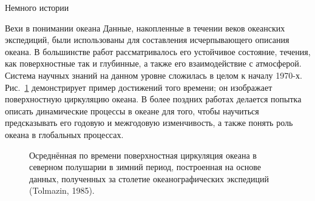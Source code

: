 \begin{chapter}{Немного истории}
\begin{section}{Вехи в понимании океана}
Данные, накопленные в течении веков океанских экспедиций, были
использованы для составления исчерпывающего описания океана.
В большинстве работ рассматривалось его устойчивое состояние, 
течения, как поверхностные так и глубинные, а также его взаимодействие с
атмосферой. Система научных знаний на данном уровне сложилась в целом   
к началу 1970-х. Рис.~\ref{fig:Fig2-8} демонстрирует пример достижений того 
времени; он изображает поверхностную циркуляцию океана. 
В более поздних работах делается попытка описать динамические
процессы в океане для того, чтобы научиться предсказывать его годовую и
межгодовую изменчивость, а также понять роль океана в глобальных
процессах.
%

\begin{figure}[t!]
\caption{Осреднённая по времени поверхностная циркуляция океана в северном 
полушарии в зимний период, построенная на основе данных, полученных 
за столетие океанографических экспедиций (Tolmazin, 1985).}
\label{fig:Fig2-8}
\end{figure}
%
%
\end{section}


\end{chapter}
